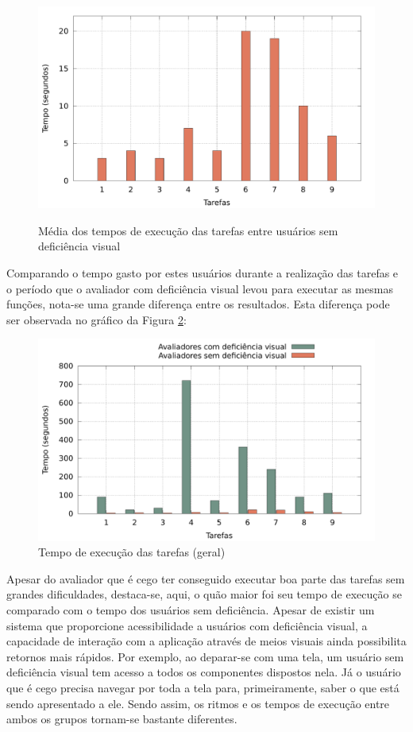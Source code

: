 \begin{figure}[H]
	\centering
	\caption[Tempo de execução -- Usuários sem deficiência visual]{Média dos tempos de execução das tarefas entre usuários sem deficiência visual}
	\includegraphics[width=0.8\linewidth]{./charts/tempo-sem-dv.pdf}
	\label{fig:tempo-sem-dv}
\end{figure}

Comparando o tempo gasto por estes usuários durante a realização das tarefas e o período que o avaliador com deficiência visual levou para executar as mesmas funções, nota-se uma grande diferença entre os resultados. Esta diferença pode ser observada no gráfico da Figura \ref{fig:tempo}:

\begin{figure}[H]
	\centering
	\caption[Tempo de execução -- Geral]{Tempo de execução das tarefas (geral)}
	\label{fig:tempo}
	\includegraphics[width=0.8\linewidth]{./charts/tempo.pdf}
\end{figure}
Apesar do avaliador que é cego ter conseguido executar boa parte das tarefas sem grandes dificuldades, destaca-se, aqui, o quão maior foi seu tempo de execução se comparado com o tempo dos usuários sem deficiência. Apesar de existir um sistema que proporcione acessibilidade a usuários com deficiência visual, a capacidade de interação com a aplicação através de meios visuais ainda possibilita retornos mais rápidos. Por exemplo, ao deparar-se com uma tela, um usuário sem deficiência visual tem acesso a todos os componentes dispostos nela. Já o usuário que é cego precisa navegar por toda a tela para, primeiramente, saber o que está sendo apresentado a ele. Sendo assim, os ritmos e os tempos de execução entre ambos os grupos tornam-se bastante diferentes.

